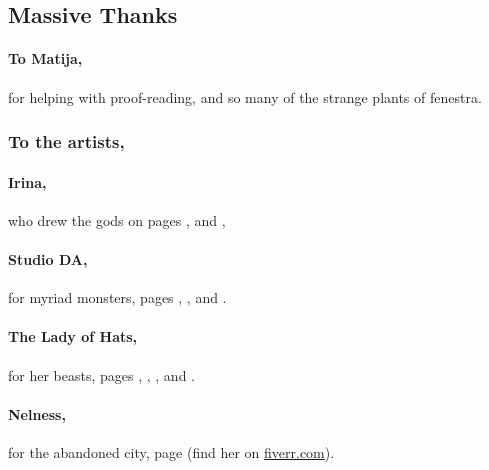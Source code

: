 \begin{multicols}{2}
\columnbreak

\subsection{Massive Thanks}

\paragraph{To Matija,}
for helping with proof-reading, and so many of the strange plants of \gls{fenestra}.

\subsubsection{To the artists,}
\paragraph{Irina,}
who drew the gods on pages
\pageref{Irina/fury}, and
\pageref{Irina/forest}, 

\paragraph{Studio DA,}
for myriad monsters,
pages
\pageref{Studio_DA/chitincrawler}, 
\pageref{Studio_DA/jelly},
and
\pageref{Studio_DA/woodspy}.

\paragraph{The Lady of Hats,}
for her beasts,
pages
\pageref{loh/dragon}, 
\pageref{loh/dryad}, 
\iftoggle{stories}{}{%
  \pageref{loh/gnoll}, 
}
\pageref{loh/griffin}, 
and
\pageref{loh/dragon}.


\paragraph{Nelness,}
for the abandoned city,
page
\pageref{Nelness/city}
(find her on \href{https://www.fiverr.com/nelnes}{fiverr.com}).

\end{multicols}

